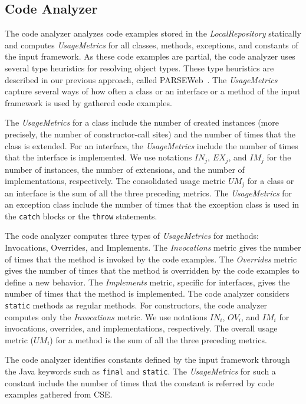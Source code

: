\documentclass[conference]{IEEEtran}
\newcommand{\CodeIn}[1]{{\small\texttt{#1}}}
\begin{document}
\subsection{Code Analyzer} 
The code analyzer analyzes code examples 
stored in the \emph{LocalRepository} statically and computes
\emph{UsageMetrics} for all classes, methods, exceptions, and constants of the input
framework. As these code examples are partial,
the code analyzer uses several type heuristics for resolving object types.
These type heuristics are described in our previous approach, called PARSEWeb~\cite{thummalapenta07:parseweb}.
The \emph{UsageMetrics} capture several ways of how often a class or an interface or a method 
of the input framework is used by gathered code examples.

The \emph{UsageMetrics} for a class include the
number of created instances (more precisely, the number of
constructor-call sites) and the number of times that the class is
extended. For an interface, the \emph{UsageMetrics} include the number
of times that the interface is implemented. We use notations
$IN_j$, $EX_j$, and $IM_j$ for the number of instances,
the number of extensions, and the number of implementations, respectively.
The consolidated usage metric $UM_j$ for a class or an interface 
is the sum of all the three preceding metrics. The \emph{UsageMetrics}
for an exception class include the number of times that the exception class
is used in the \CodeIn{catch} blocks or the \CodeIn{throw} statements. 

The code analyzer computes three types of \emph{UsageMetrics} for
methods: Invocations, Overrides, and Implements.
The \emph{Invocations} metric gives the number of times that the
method is invoked by the code examples. The \emph{Overrides} metric
gives the number of times that the method is overridden by the code
examples to define a new behavior. The \emph{Implements} metric,
specific for interfaces, gives the number of times that the method
is implemented. The code analyzer considers \CodeIn{static} methods as regular methods.
For constructors, the code analyzer computes only the \emph{Invocations} metric. 
We use notations $IN_i$, $OV_i$, and $IM_i$
for invocations, overrides, and implementations, respectively. 
The overall usage metric ($UM_i$) for a method is the sum of all the three
preceding metrics. 

The code analyzer identifies constants defined by the input framework through
the Java keywords such as \CodeIn{final} and \CodeIn{static}. The \emph{UsageMetrics}
for such a constant include the number of times that the constant is referred
by code examples gathered from CSE.
\end{document}
